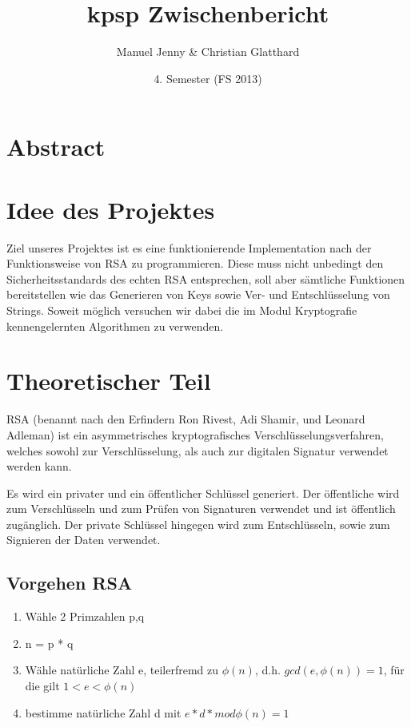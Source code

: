 \documentclass[a4paper, 11pt]{article} %
\title{kpsp Zwischenbericht}
\author{Manuel Jenny \& Christian Glatthard}
\date{4. Semester (FS 2013)}
\begin{document}
\maketitle
\thispagestyle{fancy}

\newpage

\tableofcontents	  	


\newpage
\setcounter{page}{1}


\section{Abstract}


\section{Idee des Projektes}
Ziel unseres Projektes ist es eine funktionierende Implementation nach der Funktionsweise von RSA zu programmieren. Diese muss nicht unbedingt den Sicherheitsstandards des echten RSA entsprechen, soll aber sämtliche Funktionen bereitstellen wie das Generieren von Keys sowie Ver- und Entschlüsselung von Strings.
Soweit möglich versuchen wir dabei die im Modul Kryptografie kennengelernten Algorithmen zu verwenden.

\section{Theoretischer Teil}
RSA (benannt nach den Erfindern Ron Rivest, Adi Shamir, und Leonard Adleman) ist ein asymmetrisches kryptografisches Verschlüsselungsverfahren, welches sowohl zur Verschlüsselung, als auch zur digitalen Signatur verwendet werden kann.

Es wird ein privater und ein öffentlicher Schlüssel generiert. Der öffentliche wird zum Verschlüsseln und zum Prüfen von Signaturen verwendet und ist öffentlich zugänglich. Der private Schlüssel hingegen wird zum Entschlüsseln, sowie zum Signieren der Daten verwendet.

\subsection{Vorgehen RSA}
\begin{enumerate}
\item Wähle 2 Primzahlen p,q
\item n = p * q
\item Wähle natürliche Zahl e, teilerfremd zu $\phi (n)$, d.h. $gcd(e,\phi(n)) = 1$, für die gilt $1 < e < \phi(n)$
\item bestimme natürliche Zahl d mit $e*d*mod \phi (n) = 1$
\end{enumerate}
\end{document}
